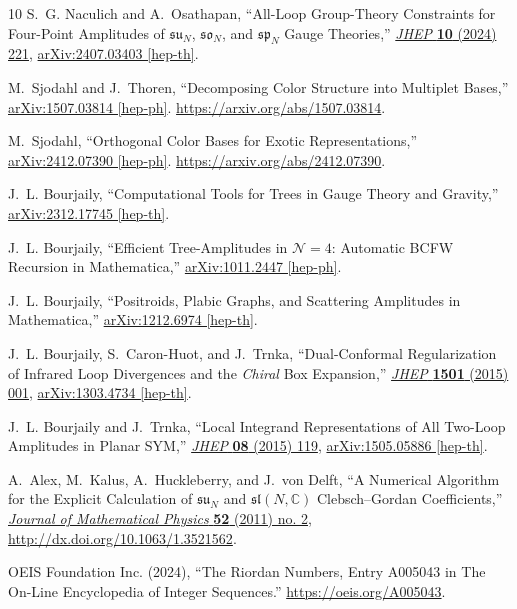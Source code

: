 \documentclass[12pt,a4paper]{article}\let\ifpdf\relax
\begin{document}
\begin{thebibliography}{10}
S.~G. Naculich and A.~Osathapan, ``{All-Loop Group-Theory Constraints for
  Four-Point Amplitudes of $\mathfrak{su}_{N}$, $\mathfrak{so}_{N}$, and
  $\mathfrak{sp}_{N}$ Gauge Theories},''
  \href{http://dx.doi.org/10.1007/JHEP10(2024)221}{{\em JHEP} {\bf 10} (2024)
  221}, \href{http://arxiv.org/abs/2407.03403}{{ arXiv:2407.03403 [hep-th]}}.

M.~Sjodahl and J.~Thoren, ``{Decomposing Color Structure into Multiplet
  Bases},'' \href{http://arxiv.org/abs/1507.03814}{{ arXiv:1507.03814
  [hep-ph]}}. \url{https://arxiv.org/abs/1507.03814}.

M.~Sjodahl, ``{Orthogonal Color Bases for Exotic Representations},''
  \href{http://arxiv.org/abs/2412.07390}{{ arXiv:2412.07390 [hep-ph]}}.
  \url{https://arxiv.org/abs/2412.07390}.

J.~L. Bourjaily, ``{Computational Tools for Trees in Gauge Theory and
  Gravity},'' \href{http://arxiv.org/abs/2312.17745}{{ arXiv:2312.17745
  [hep-th]}}.

J.~L. Bourjaily, ``{Efficient Tree-Amplitudes in $\mathcal{N}\!=\!4$: Automatic
  BCFW Recursion in {\sc Mathematica}},''
\href{http://arxiv.org/abs/1011.2447}{{ arXiv:1011.2447 [hep-ph]}}.

J.~L. Bourjaily, ``{Positroids, Plabic Graphs, and Scattering Amplitudes in
  {\sc Mathematica}},''
\href{http://arxiv.org/abs/1212.6974}{{ arXiv:1212.6974 [hep-th]}}.

J.~L. Bourjaily, S.~Caron-Huot, and J.~Trnka, ``{Dual-Conformal Regularization
  of Infrared Loop Divergences and the {\it Chiral} Box Expansion},''
  \href{http://dx.doi.org/10.1007/JHEP01(2015)001}{{\em JHEP} {\bf 1501} (2015)
   001},
\href{http://arxiv.org/abs/1303.4734}{{ arXiv:1303.4734 [hep-th]}}.

J.~L. Bourjaily and J.~Trnka, ``{Local Integrand Representations of All
  Two-Loop Amplitudes in Planar SYM},''
  \href{http://dx.doi.org/10.1007/JHEP08(2015)119}{{\em JHEP} {\bf 08} (2015)
  119},
\href{http://arxiv.org/abs/1505.05886}{{ arXiv:1505.05886 [hep-th]}}.

A.~Alex, M.~Kalus, A.~Huckleberry, and J.~von Delft, ``{A Numerical Algorithm
  for the Explicit Calculation of $\mathfrak{su}_{N}$ and
  $\mathfrak{sl}(N,\mathbb{C})$ Clebsch--Gordan Coefficients},''
  \href{http://dx.doi.org/10.1063/1.3521562}{{\em Journal of Mathematical
  Physics} {\bf 52} (2011) no. 2, } \url{http://dx.doi.org/10.1063/1.3521562}.

{OEIS Foundation Inc. (2024)}, ``{The Riordan Numbers, Entry A005043 in The
  On-Line Encyclopedia of Integer Sequences}.''
\newblock \url{https://oeis.org/A005043}.

\end{thebibliography}\endgroup
\end{document}
